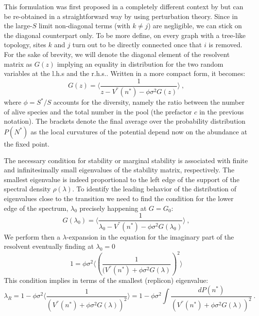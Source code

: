 \documentclass[12pt]{article}
\begin{document}
This formulation was first proposed in a completely different context by \cite{abou1973} but can be re-obtained in a straightforward way by using perturbation theory.
Since in the large-$S$ limit non-diagonal terms (with $k \neq j$) are negligible, we can stick on the diagonal counterpart only. To be more define, on every graph with a tree-like topology, sites $k$ and $j$ turn out to be directly connected once that $i$ is removed.
For the sake of brevity, we will denote the diagonal element of the resolvent matrix as $G(z)$ implying an equality in distribution for the two random variables at the l.h.s and the r.h.s..
Written in a more compact form, it becomes:
\begin{equation}
G(z)=\biggl \langle \frac{1}{z-V^{''}(n^{*}) -\phi \sigma^2 G(z)} \biggr \rangle \  ,
\end{equation}
where $\phi=S^{*}/S$ accounts for the diversity, namely the ratio between the number of alive species and the total number in the pool (the prefactor $c$ in the previous notation).
The brackets denote the final average over the probability distribution $P(N^{*})$ as the local curvatures of the potential depend now on the abundance at the fixed point. 

The necessary condition for stability or marginal stability is associated with finite and infinitesimally small eigenvalues of the stability matrix, respectively. The smallest eigenvalue is indeed proportional to the left edge of the support of the spectral density $\rho(\lambda)$. 
To identify the leading behavior of the distribution of eigenvalues close to the transition we need to find the condition for the lower edge of the spectrum, $\lambda_0$ precisely happening at $G=G_0$:
\begin{equation}
G(\lambda_0)=\biggl \langle \frac{1}{\lambda_0-V^{''}(n^{*}) -\phi \sigma^2 G(\lambda_0)} \biggr \rangle \  ,
\end{equation}
We perform then a $\lambda$-expansion in the equation for the imaginary part of the resolvent eventually finding at $\lambda_0=0$ 
\begin{equation}
1=\phi \sigma^2\biggl \langle \left(\frac{1}{(V^{''}(n^{*}) +\phi \sigma^2 G(\lambda)} \right)^2\biggr \rangle
\end{equation}
This condition implies in terms of the smallest (replicon) eigenvalue:
\begin{equation}
\lambda_R=1-\phi \sigma^2 \biggl \langle \frac{1}{(V^{''}(n^{*}) +\phi \sigma^2 G(\lambda))^2}  \biggr \rangle=1-\phi \sigma^2 \int {\frac{dP(n^{*})}{(V^{''}(n^{*}) +\phi \sigma^2 G(\lambda))^2}} \ .
\end{equation}
\end{document}
